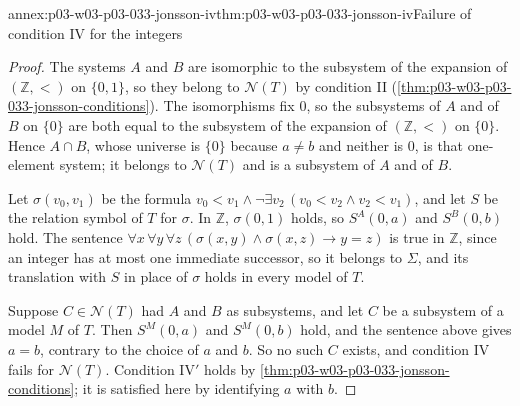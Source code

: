 \begin{annexitem}{annex:p03-w03-p03-033-jonsson-iv}{thm:p03-w03-p03-033-jonsson-iv}{Failure of condition IV for the integers}
\begin{proof}
The systems \(A\) and \(B\) are isomorphic to the subsystem of the
expansion of \((\mathbb Z,<)\) on \(\{0,1\}\), so they belong to
\(\mathcal N(T)\) by condition II
(\cref{thm:p03-w03-p03-033-jonsson-conditions}). The isomorphisms fix
\(0\), so the subsystems of \(A\) and of \(B\) on \(\{0\}\) are both
equal to the subsystem of the expansion of \((\mathbb Z,<)\) on
\(\{0\}\). Hence \(A\cap B\), whose universe is \(\{0\}\) because
\(a\neq b\) and neither is \(0\), is that one-element system; it belongs
to \(\mathcal N(T)\) and is a subsystem of \(A\) and of \(B\).

Let \(\sigma(v_0,v_1)\) be the formula
\(v_0<v_1\wedge\neg\exists v_2\,(v_0<v_2\wedge v_2<v_1)\), and let \(S\)
be the relation symbol of \(T\) for \(\sigma\). In \(\mathbb Z\),
\(\sigma(0,1)\) holds, so \(S^A(0,a)\) and \(S^B(0,b)\) hold. The
sentence
\(\forall x\,\forall y\,\forall z\,(\sigma(x,y)\wedge\sigma(x,z)\to y=z)\)
is true in \(\mathbb Z\), since an integer has at most one immediate
successor, so it belongs to \(\Sigma\), and its translation with \(S\) in
place of \(\sigma\) holds in every model of \(T\).

Suppose \(C\in\mathcal N(T)\) had \(A\) and \(B\) as subsystems, and let
\(C\) be a subsystem of a model \(M\) of \(T\). Then \(S^M(0,a)\) and
\(S^M(0,b)\) hold, and the sentence above gives \(a=b\), contrary to the
choice of \(a\) and \(b\). So no such \(C\) exists, and condition IV fails
for \(\mathcal N(T)\). Condition IV\('\) holds by
\cref{thm:p03-w03-p03-033-jonsson-conditions}; it is satisfied here by
identifying \(a\) with \(b\).
\end{proof}
\end{annexitem}

